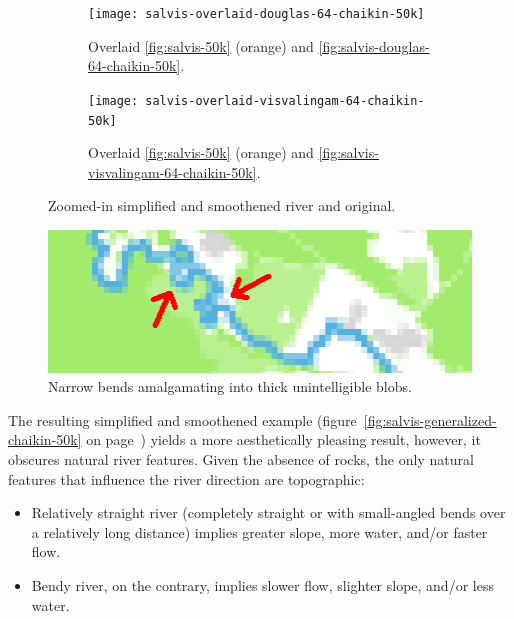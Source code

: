 \documentclass[a4paper]{article}
\newcommand{\onpage}[1]{\ref{#1} on page~\pageref{#1}}
\begin{document}
\begin{figure}[ht!]
    \centering
    \begin{subfigure}[b]{.49\textwidth}
        \texttt{[image: salvis-overlaid-douglas-64-chaikin-50k]}

        \caption{Overlaid \ref{fig:salvis-50k} (orange) and
            \ref{fig:salvis-douglas-64-chaikin-50k}.}

    \end{subfigure}
    \hfill
    \begin{subfigure}[b]{.49\textwidth}
        \texttt{[image: salvis-overlaid-visvalingam-64-chaikin-50k]}

        \caption{Overlaid \ref{fig:salvis-50k} (orange) and
            \ref{fig:salvis-visvalingam-64-chaikin-50k}.}

    \end{subfigure}
    \caption{Zoomed-in simplified and smoothened river and original.}
    \label{fig:salvis-overlaid-generalized-chaikin-50k}
\end{figure}

\begin{figure}[b!]
    \centering
    \includegraphics[width=.9\textwidth]{amalgamate1}
    \caption{Narrow bends amalgamating into thick unintelligible blobs.}
    \label{fig:pixel-amalgamation}
\end{figure}

The resulting simplified and smoothened example
(figure~\onpage{fig:salvis-generalized-chaikin-50k}) yields a more
aesthetically pleasing result, however, it obscures natural river features.
Given the absence of rocks, the only natural features that influence the river
direction are topographic:

\begin{itemize}

    \item Relatively straight river (completely straight or with small-angled
        bends over a relatively long distance) implies greater slope, more
        water, and/or faster flow.

    \item Bendy river, on the contrary, implies slower flow, slighter slope,
        and/or less water.

\end{itemize}
\end{document}
